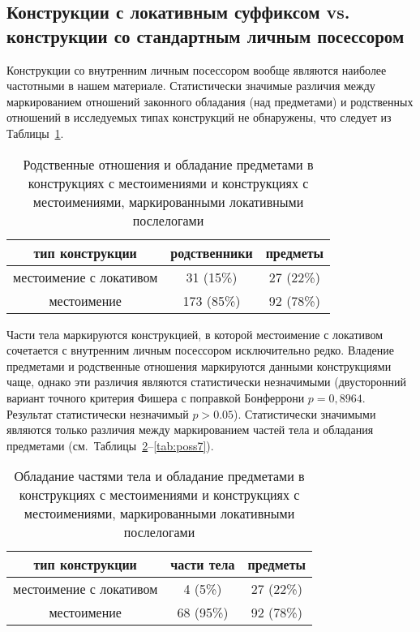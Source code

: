 \subsection{Конструкции с локативным суффиксом vs. конструкции со стандартным личным посессором}

Конструкции со внутренним личным посессором вообще являются наиболее частотными в нашем материале. Статистически значимые различия между маркированием отношений законного обладания (над предметами) и родственных отношений в исследуемых типах конструкций не обнаружены, что следует из Таблицы~\ref{tab:poss5}.

\begin{table}[h]
 \centering
 \caption{Родственные отношения и обладание предметами в конструкциях с местоимениями и конструкциях с местоимениями, маркированными локативными послелогами}
 \smallskip
 \label{tab:poss5}
 \begin{tabular}{c|cc} \toprule
 тип конструкции & родственники & предметы \\ \midrule
 местоимение с локативом & 31 (15\%) & 27 (22\%) \\
 местоимение & 173 (85\%) & 92 (78\%) \\ \bottomrule
 \end{tabular}
\end{table}

Части тела маркируются конструкцией, в которой местоимение с локативом сочетается с внутренним личным посессором исключительно редко. Владение предметами и родственные отношения маркируются данными конструкциями чаще, однако эти различия являются статистически незначимыми (двусторонний вариант точного критерия Фишера с поправкой Бонферрони $p = 0,8964$. Результат статистически незначимый $p > 0.05$). Статистически значимыми являются только различия между маркированием частей тела и обладания предметами (см.~Таблицы~\ref{tab:poss6}–\ref{tab:poss7}).

\begin{table}[h]
 \centering
 \caption{Обладание частями тела и обладание предметами в конструкциях с местоимениями и конструкциях с местоимениями, маркированными локативными послелогами}
 \smallskip
 \label{tab:poss6}
 \begin{tabular}{c|cc} \toprule
 тип конструкции & части тела & предметы \\ \midrule
 местоимение с локативом & 4 (5\%) & 27 (22\%) \\
 местоимение & 68 (95\%) & 92 (78\%) \\ \bottomrule
 \end{tabular}
\end{table}


